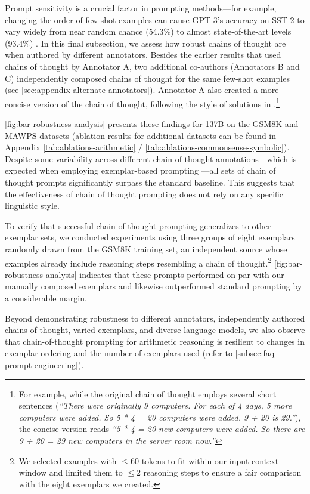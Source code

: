 Prompt sensitivity is a crucial factor in prompting methods—for example, changing the order of few-shot examples can cause GPT-3’s accuracy on SST-2 to vary widely from near random chance (54.3\%) to almost state-of-the-art levels (93.4\%) \citep{zhao2021calibrate}. In this final subsection, we assess how robust chains of thought are when authored by different annotators. Besides the earlier results that used chains of thought by Annotator A, two additional co-authors (Annotators B and C) independently composed chains of thought for the same few-shot examples (see \cref{sec:appendix-alternate-annotators}). Annotator A also created a more concise version of the chain of thought, following the style of solutions in \citet{cobbe2021training}.\footnote{For example, while the original chain of thought employs several short sentences (\textit{``There were originally 9 computers. For each of 4 days, 5 more computers were added. So 5 * 4 = 20 computers were added. 9 + 20 is 29.''}), the concise version reads \textit{``5 * 4 = 20 new computers were added. So there are 9 + 20 = 29 new computers in the server room now.''}}

\cref{fig:bar-robustness-analysis} presents these findings for \lamda{} 137B on the GSM8K and MAWPS datasets (ablation results for additional datasets can be found in Appendix \cref{tab:ablations-arithmetic} / \cref{tab:ablations-commonsense-symbolic}). Despite some variability across different chain of thought annotations—which is expected when employing exemplar-based prompting \citep{le-scao-rush-2021-many,reynolds2021prompt,zhao2021calibrate}—all sets of chain of thought prompts significantly surpass the standard baseline. This suggests that the effectiveness of chain of thought prompting does not rely on any specific linguistic style.

To verify that successful chain-of-thought prompting generalizes to other exemplar sets, we conducted experiments using three groups of eight exemplars randomly drawn from the GSM8K training set, an independent source whose examples already include reasoning steps resembling a chain of thought.\footnote{We selected examples with $\leq 60$ tokens to fit within our input context window and limited them to $\leq 2$ reasoning steps to ensure a fair comparison with the eight exemplars we created.} \cref{fig:bar-robustness-analysis} indicates that these prompts performed on par with our manually composed exemplars and likewise outperformed standard prompting by a considerable margin.

Beyond demonstrating robustness to different annotators, independently authored chains of thought, varied exemplars, and diverse language models, we also observe that chain-of-thought prompting for arithmetic reasoning is resilient to changes in exemplar ordering and the number of exemplars used (refer to \cref{subsec:faq-prompt-engineering}).

